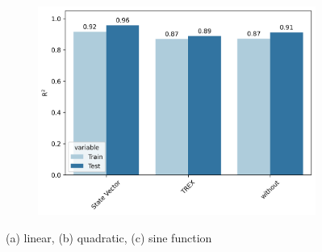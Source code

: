 \documentclass[journal=jacsat,manuscript=article]{achemso}
\begin{document}
\begin{figure}[H]
\begin{subfigure}[b]{0.49\textwidth}
		\caption{}
		\label{fig:quadratic_error_mitigation}
	\end{subfigure}	
	\begin{subfigure}[b]{0.49\textwidth}
		\centering
		\includegraphics[width=\linewidth]{../images/Function_Fitting/sine_error_mitigation.png}
		\caption{}
		\label{fig:sine_error_mitigation}
	\end{subfigure}
	\hfill		
	\caption{(a) linear, (b) quadratic, (c) sine function}
	\label{fig:functionfitting_errormitigation}	
\end{figure}
\end{document}
